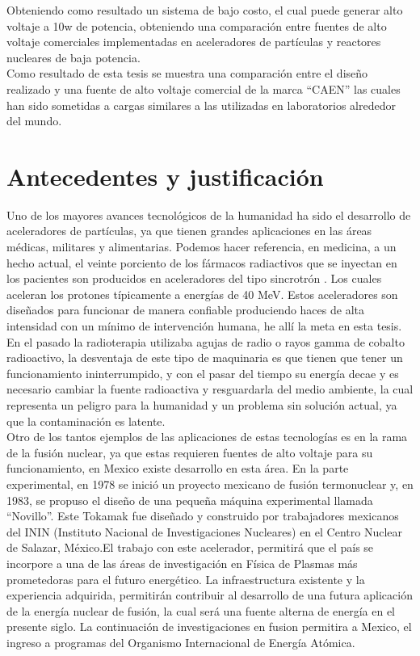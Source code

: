 Obteniendo como resultado un sistema de bajo costo, el cual puede generar alto voltaje a 10w de potencia, obteniendo una comparación entre fuentes de alto voltaje comerciales implementadas en aceleradores de partículas y reactores nucleares de baja potencia. \\

Como resultado de esta tesis se muestra una comparación entre el diseño realizado y una fuente de alto voltaje comercial de la marca ``CAEN'' las cuales han sido sometidas a cargas similares a las utilizadas en laboratorios alrededor del mundo.\newpage




\section{Antecedentes y justificación}


Uno de los mayores avances tecnológicos de la humanidad ha sido el desarrollo de aceleradores de partículas, ya que tienen grandes aplicaciones en las áreas médicas, militares y alimentarias. Podemos hacer referencia, en medicina, a un hecho actual, el veinte porciento de los fármacos radiactivos que se inyectan en los pacientes son producidos en aceleradores del tipo sincrotrón \cite{ProyectoLNLS5}. Los cuales aceleran los protones típicamente a energías de 40 MeV. Estos aceleradores son diseñados para funcionar de manera confiable produciendo haces de alta intensidad con un mínimo de intervención humana, he allí la meta en esta tesis.\\

En el pasado la radioterapia utilizaba agujas de radio o rayos gamma de cobalto radioactivo, la desventaja de este tipo de maquinaria es que tienen que tener un funcionamiento ininterrumpido, y con el pasar del tiempo su energía decae y es necesario cambiar la fuente radioactiva y resguardarla del medio ambiente, la cual representa un peligro para la humanidad y un problema sin solución actual, ya que la contaminación es latente.\\

Otro de los tantos ejemplos de las aplicaciones de estas tecnologías es en la rama de la fusión nuclear, ya que estas requieren fuentes de alto voltaje para su funcionamiento, en Mexico existe desarrollo en esta área. En la parte experimental, en 1978 se inició un proyecto mexicano de fusión termonuclear y, en 1983, se propuso el diseño de una pequeña máquina experimental llamada “Novillo”. Este Tokamak fue diseñado y construido por trabajadores mexicanos del ININ (Instituto Nacional de Investigaciones Nucleares) en el Centro Nuclear de Salazar, México.El trabajo con este acelerador, permitirá que el país se incorpore a una de las áreas de investigación en Física de Plasmas más prometedoras para el futuro energético. La infraestructura existente y la experiencia adquirida, permitirán contribuir al desarrollo de una futura aplicación de la energía nuclear de fusión, la cual será una fuente alterna de energía en el presente siglo. La continuación de investigaciones en fusion permitira a Mexico, el ingreso a programas del Organismo Internacional de Energía Atómica\cite{ININ}.\\

